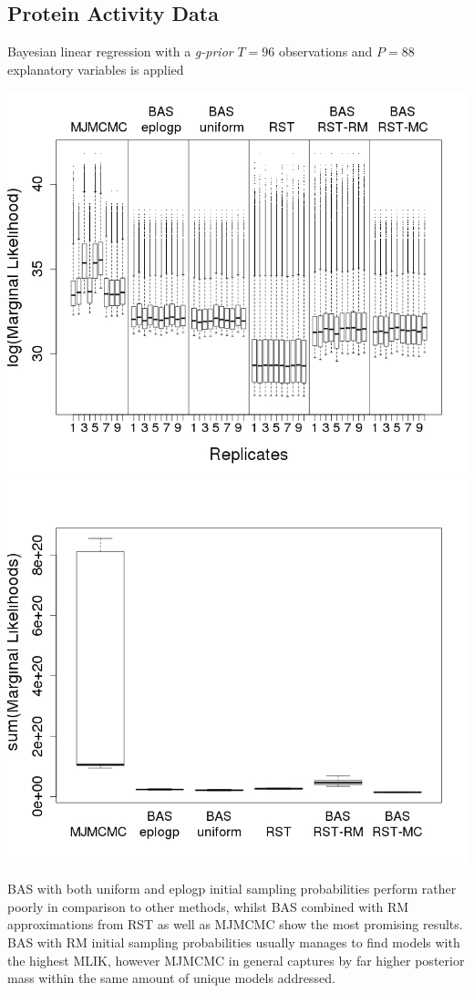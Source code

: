 \documentclass[a0,portrait]{a0poster}
\begin{document}
\begin{multicols}{2}
\subsection*{Protein Activity Data}
\color{DarkSlateGray} %
Bayesian linear regression with a \textit{g-prior} $T = 96$ observations and $P = 88$ explanatory variables is applied
\begin{center}\vspace{0cm}
\includegraphics[width=0.48\linewidth]{figures/mliks.jpeg}
\includegraphics[width=0.48\linewidth]{figures/massesbig.jpeg}\label{figmlikmass}
\end{center}\vspace{0.2cm}


BAS with both uniform and eplogp initial sampling probabilities perform rather poorly in comparison to other methods, whilst BAS combined with RM approximations from RST as well as MJMCMC show the most promising results. BAS with RM initial sampling probabilities usually manages to find models with the highest MLIK, however MJMCMC in general captures by far higher posterior mass within the same amount of unique models addressed.


\end{multicols}
\end{document}
